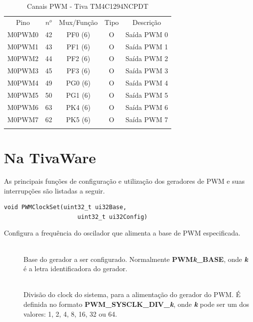 \begin{center}
	\begin{longtable}{|c|c|c|c|c|}
		\rowcolor[HTML]{000000}
		{\color[HTML]{FFFFFF} Pino} & {\color[HTML]{FFFFFF} $n^{o}$} & {\color[HTML]{FFFFFF} Mux/Função} & {\color[HTML]{FFFFFF} Tipo} & {\color[HTML]{FFFFFF} Descrição}            \\
		M0PWM0    & 42  & PF0 (6) & O & Saída PWM 0\\
		M0PWM1    & 43  & PF1 (6) & O & Saída PWM 1\\
		M0PWM2    & 44  & PF2 (6) & O & Saída PWM 2\\
		M0PWM3    & 45  & PF3 (6) & O & Saída PWM 3\\
		M0PWM4    & 49  & PG0 (6) & O & Saída PWM 4\\
		M0PWM5    & 50  & PG1 (6) & O & Saída PWM 5\\
		M0PWM6    & 63  & PK4 (6) & O & Saída PWM 6\\
		M0PWM7    & 62  & PK5 (6) & O & Saída PWM 7\\
		\hline
		\caption{Canais PWM - Tiva TM4C1294NCPDT \cite{DATASHEET_TIVA} }
		\label{tab:CanaisPWM}
	\end{longtable}
\end{center}

\section{Na TivaWare}

As principais funções de configuração e utilização dos geradores de PWM e suas interrupções são listadas a seguir.

\begin{lstlisting}[style=funcao]
	void PWMClockSet(uint32_t ui32Base,
					 uint32_t ui32Config)
\end{lstlisting}

Configura a frequência do oscilador que alimenta a base de PWM especificada.

\begin{description}
	\item []\hfill \\
	Base do gerador a ser configurado. Normalmente \textbf{PWM\emph{k}\_BASE}, onde \textbf{\emph{k}} é a letra identificadora do gerador.
	
	\item []\hfill \\
	Divisão do clock do sistema, para a alimentação do gerador do PWM. É definida no formato \textbf{PWM\_SYSCLK\_DIV\_\emph{k}}, onde \textbf{\emph{k}} pode ser um dos valores: 1, 2, 4, 8, 16, 32 ou 64.
\end{description}

